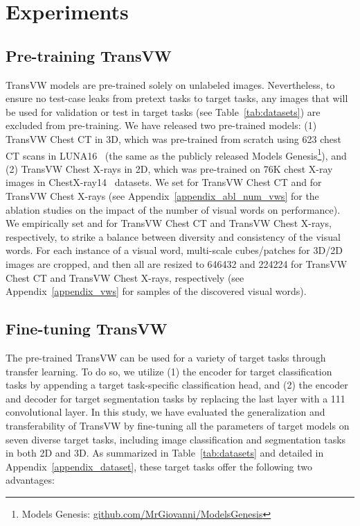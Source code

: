 \documentclass[journal,twoside,web]{ieeecolor}
\def\tablename{Table}
\begin{document}
\section{Experiments}
\subsection{Pre-training TransVW}
\label{sec:Pre-training_TransVW}
TransVW models are pre-trained solely on unlabeled images. Nevertheless, to ensure no test-case leaks from pretext tasks to target tasks, any images that will be used for validation or test in target tasks (see \tablename~\ref{tab:datasets}) are excluded from pre-training. 
We have released two pre-trained models: (1) TransVW Chest CT in 3D, which was pre-trained from scratch using 623 chest CT scans in LUNA16~\cite{setio2017validation} (the same as the publicly released Models Genesis\footnote{\label{foot:modelsgenesis}Models Genesis: \href{https://github.com/MrGiovanni/ModelsGenesis}{github.com/MrGiovanni/ModelsGenesis}}), and (2) TransVW Chest X-rays in 2D, which was pre-trained on 76K chest X-ray images in ChestX-ray14~\cite{wang2017chestx} datasets. We set   for TransVW Chest CT and   for TransVW Chest X-rays (see Appendix~\ref{appendix_abl_num_vws} for the ablation studies on the impact of the number of visual words on performance).   
We empirically set   and  for TransVW Chest CT and TransVW Chest X-rays, respectively, to strike a balance between diversity and consistency of the visual words. For each instance of a visual word, multi-scale cubes/patches for 3D/2D images are cropped, and then all are resized to 646432 and 224224 for TransVW Chest CT and TransVW Chest X-rays, respectively (see Appendix~\ref{appendix_vws} for samples of the discovered visual words).



\subsection{Fine-tuning TransVW}
\label{sec:experiments_finetune}

The pre-trained TransVW can be used for a variety of target tasks through transfer learning. To do so, we utilize (1) the encoder for target classification tasks by appending a target task-specific classification head, and (2) the encoder and decoder for target segmentation tasks by replacing the last layer with a 111 convolutional layer. In this study, we have evaluated the generalization and transferability of TransVW by fine-tuning all the parameters of target models on seven diverse target tasks, including  image  classification and  segmentation  tasks  in  both  2D  and  3D. As summarized in \tablename~\ref{tab:datasets} and detailed in Appendix~\ref{appendix_dataset}, these target tasks offer the following two advantages:
\end{document}
